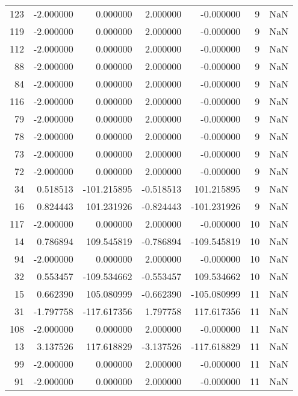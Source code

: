\begin{tabular}{rrrrrrr}
123 & -2.000000 &    0.000000 &  2.000000 &   -0.000000 &           9 & NaN \\
119 & -2.000000 &    0.000000 &  2.000000 &   -0.000000 &           9 & NaN \\
112 & -2.000000 &    0.000000 &  2.000000 &   -0.000000 &           9 & NaN \\
 88 & -2.000000 &    0.000000 &  2.000000 &   -0.000000 &           9 & NaN \\
 84 & -2.000000 &    0.000000 &  2.000000 &   -0.000000 &           9 & NaN \\
116 & -2.000000 &    0.000000 &  2.000000 &   -0.000000 &           9 & NaN \\
 79 & -2.000000 &    0.000000 &  2.000000 &   -0.000000 &           9 & NaN \\
 78 & -2.000000 &    0.000000 &  2.000000 &   -0.000000 &           9 & NaN \\
 73 & -2.000000 &    0.000000 &  2.000000 &   -0.000000 &           9 & NaN \\
 72 & -2.000000 &    0.000000 &  2.000000 &   -0.000000 &           9 & NaN \\
 34 &  0.518513 & -101.215895 & -0.518513 &  101.215895 &           9 & NaN \\
 16 &  0.824443 &  101.231926 & -0.824443 & -101.231926 &           9 & NaN \\
117 & -2.000000 &    0.000000 &  2.000000 &   -0.000000 &          10 & NaN \\
 14 &  0.786894 &  109.545819 & -0.786894 & -109.545819 &          10 & NaN \\
 94 & -2.000000 &    0.000000 &  2.000000 &   -0.000000 &          10 & NaN \\
 32 &  0.553457 & -109.534662 & -0.553457 &  109.534662 &          10 & NaN \\
 15 &  0.662390 &  105.080999 & -0.662390 & -105.080999 &          11 & NaN \\
 31 & -1.797758 & -117.617356 &  1.797758 &  117.617356 &          11 & NaN \\
108 & -2.000000 &    0.000000 &  2.000000 &   -0.000000 &          11 & NaN \\
 13 &  3.137526 &  117.618829 & -3.137526 & -117.618829 &          11 & NaN \\
 99 & -2.000000 &    0.000000 &  2.000000 &   -0.000000 &          11 & NaN \\
 91 & -2.000000 &    0.000000 &  2.000000 &   -0.000000 &          11 & NaN \\

\end{tabular}
